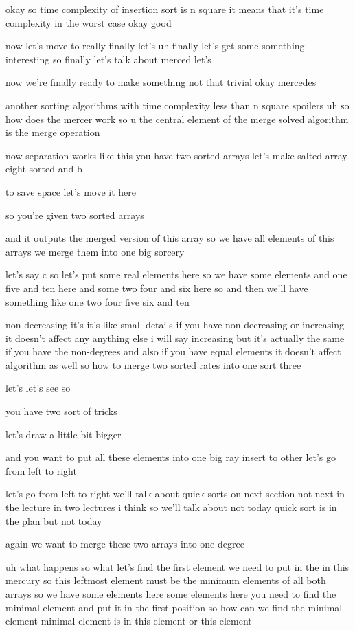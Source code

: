 okay so time complexity of insertion sort is n square it means that it's time complexity in the worst case okay good

now let's move to really finally let's uh finally let's get some something interesting so finally let's talk about merced let's

now we're finally ready to make something not that trivial okay mercedes

another sorting algorithms with time complexity less than n square spoilers uh so how does the mercer work so u the central element of the merge solved algorithm is the merge operation

now separation works like this you have two sorted arrays let's make salted array eight sorted and b

to save space let's move it here

so you're given two sorted arrays

and it outputs the merged version of this array so we have all elements of this arrays we merge them into one big sorcery

let's say c so let's put some real elements here so we have some elements and one five and ten here and some two four and six here so and then we'll have something like one two four five six and ten

non-decreasing it's it's like small details if you have non-decreasing or increasing it doesn't affect any anything else i will say increasing but it's actually the same if you have the non-degrees and also if you have equal elements it doesn't affect algorithm as well so how to merge two sorted rates into one sort three

let's let's see so

you have two sort of tricks

let's draw a little bit bigger

and you want to put all these elements into one big ray insert to other let's go from left to right

let's go from left to right we'll talk about quick sorts on next section not next in the lecture in two lectures i think so we'll talk about not today quick sort is in the plan but not today

again we want to merge these two arrays into one degree

uh what happens so what let's find the first element we need to put in the in this mercury so this leftmost element must be the minimum elements of all both arrays so we have some elements here some elements here you need to find the minimal element and put it in the first position so how can we find the minimal element minimal element is in this element or this element

